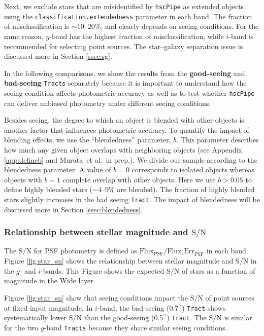 \documentclass[useamsfonts]{pasj01}
\def\asec{$^{\prime\prime}$}
\def\etal{{\ et al.~}}
\def\hscpipe{\texttt{hscPipe}}
\def\tract{\texttt{Tract}}
\def\tracts{\texttt{Tracts}}
\def\s2n{{$\mathrm{S}/\mathrm{N}$}}
\begin{document}
    Next, we exclude stars that are misidentified by \hscpipe{} as extended
    objects using the \texttt{classification.extendedness} parameter in each band.
    The fraction of misclassification is ${\sim}10$--$20$\%, and clearly depends on
    seeing conditions.
    For the same reason, $g$-band has the highest fraction of misclassification,
    while $i$-band is recommended for selecting point sources.
    The star--galaxy separation issue is discussed more in Section \ref{ssec:sg}.

    In the following comparisons, we show the results from the
    \textbf{good-seeing} and \textbf{bad-seeing} \tracts{} separately because it
    is important to understand how the seeing condition affects photometric accuracy 
    as well as to test whether \hscpipe{} can deliver unbiased photometry under 
    different seeing conditions.
    
    Besides seeing, the degree to which an object is blended with other objects 
    is another factor that influences photometric accuracy. 
    To quantify the impact of blending effects, we use the ``blendedness'' 
    parameter, $b$. 
    This parameter describes how much any given object overlaps with neighboring 
    objects (see Appendix \ref{app:defineb} and Murata\etal in prep.). 
    We divide our sample according to the blendedness parameter. 
    A value of $b=0$ corresponds to isolated objects whereas objects with $b=1$ 
    complete overlap with other objects. 
    Here we use $b>0.05$ to define highly blended stars (${\sim}4$--$9$\% are blended).
    The fraction of highly blended stars slightly increases in the bad seeing \tract{}. 
    The impact of blendedness will be discussed more in Section \ref{ssec:blendedness}.

\subsubsection{Relationship between stellar magnitude and \s2n{}}

    The \s2n{} for PSF photometry is defined as
    $\mathrm{Flux}_{\mathrm{PSF}}/\mathrm{Flux\_Err}_{\mathrm{PSF}}$ in each band. 
    Figure \ref{fig:star_sn} shows the relationship between stellar magnitude and \s2n{} 
    in the $g$- and $i$-bands. 
    This Figure shows the expected \s2n{} of stars as a function of magnitude in the 
    Wide layer.
    
    Figure \ref{fig:star_sn} show that seeing conditions impact the \s2n{} of point
    sources at fixed input magnitude.
    In $i$-band, the bad-seeing (0.7\asec{}) \tract{} shows systematically
    lower \s2n{} than the good-seeing (0.5\asec{}) \tract{}.
    The \s2n{} is similar for the two $g$-band \tracts{} because they share similar 
    seeing conditions. 
\end{document}
